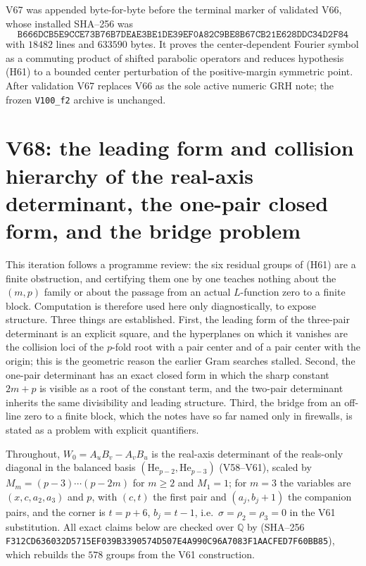 \documentclass[11pt]{article}
\theoremstyle{definition}
\theoremstyle{remark}
\begin{document}
V67 was appended byte-for-byte before the terminal marker of validated
V66, whose installed SHA--256 was
\[
 \texttt{B666DCB5E9CCE73B76B7DEAE3BE1DE39}
 \allowbreak\texttt{EF0A82C9BE8B67CB21E628DDC34D2F84}
\]
with \(18482\) lines and \(633590\) bytes.  It proves the
center-dependent Fourier symbol as a commuting product of shifted
parabolic operators and reduces hypothesis (H61) to a bounded center
perturbation of the positive-margin symmetric point.  After validation
V67 replaces V66 as the sole active numeric GRH note; the frozen
\texttt{V100\_f2} archive is unchanged.





\clearpage
\section{V68: the leading form and collision hierarchy of the real-axis determinant, the one-pair closed form, and the bridge problem}
\label{sec:f2v68-structure}
\begingroup
\setcounter{equation}{0}
\renewcommand{\theequation}{N68.\arabic{equation}}
\renewcommand{\theHequation}{f2v68.\arabic{equation}}

This iteration follows a programme review: the six residual groups of
(H61) are a finite obstruction, and certifying them one by one teaches
nothing about the \((m,p)\) family or about the passage from an actual
\(L\)-function zero to a finite block.  Computation is therefore used here
only diagnostically, to expose structure.  Three things are established.
First, the leading form of the three-pair determinant is an explicit
square, and the hyperplanes on which it vanishes are the collision loci
of the \(p\)-fold root with a pair center and of a pair center with the
origin; this is the geometric reason the earlier Gram searches stalled.
Second, the one-pair determinant has an exact closed form in which the
sharp constant \(2m+p\) is visible as a root of the constant term, and
the two-pair determinant inherits the same divisibility and leading
structure.  Third, the bridge from an off-line zero to a finite block,
which the notes have so far named only in firewalls, is stated as a
problem with explicit quantifiers.

Throughout, \(W_0=A_uB_v-A_vB_u\) is the real-axis determinant of the
reals-only diagonal in the balanced basis
\((\mathrm{He}_{p-2},\mathrm{He}_{p-3})\) (V58--V61), scaled by
\(M_m=(p-3)\cdots(p-2m)\) for \(m\ge2\) and \(M_1=1\); for \(m=3\) the
variables are \((x,c,a_2,a_3)\) and \(p\), with \((c,t)\) the first pair
and \((a_j,b_j+1)\) the companion pairs, and the corner is
\(t=p+6\), \(b_j=t-1\), i.e.\ \(\sigma=\rho_2=\rho_3=0\) in the V61
substitution.  All exact claims below are checked over \(\mathbb Q\) by
 (SHA--256
\texttt{F312CD636032D5715EF039B3390574D5}\allowbreak\texttt{07E4A990C96A7083F1AACFED7F60BB85}), which rebuilds the
\(578\) groups from the V61 construction.
\end{document}
